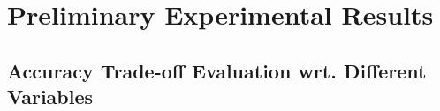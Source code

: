 \documentclass[sigconf, anonymous]{acmart}
\begin{document}




\section{Preliminary Experimental Results}
\label{sec_experiment}


\subsection{Accuracy Trade-off Evaluation wrt. Different Variables}
\label{subsec_vs_variables}
\end{document}
